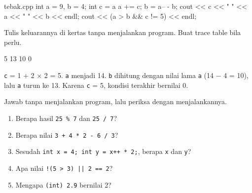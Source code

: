 \documentclass[a4paper]{article}
\begin{document}
\begin{MKode}{tebak.cpp}
int a = 9, b = 4;
int c = a %
a += c;
b = a-- - b;
cout << c << " " << a << " " << b << endl;
cout << (a > b && c != 5) << endl;
\end{MKode}
\begin{Tebak}[]
Tulis keluarannya di kertas tanpa menjalankan program. Buat trace table bila perlu.
\end{Tebak}
\begin{Jawaban}[]
\begin{MKeluaran}[]
5 13 10
0
\end{MKeluaran}
\texttt{c} = 1 + 2 × 2 = 5. \texttt{a} menjadi 14. \texttt{b} dihitung dengan nilai lama \texttt{a} (14 − 4 = 10), lalu \texttt{a} turun ke 13. Karena \texttt{c} = 5, kondisi terakhir bernilai 0.
\end{Jawaban}
\par\vspace{4pt}\par\vspace{6pt}
Jawab tanpa menjalankan program, lalu periksa dengan menjalankannya.
\begin{enumerate}
\item Berapa hasil \texttt{25 \% 7} dan \texttt{25 / 7}?
\item Berapa nilai \texttt{3 + 4 * 2 - 6 / 3}?
\item Sesudah \texttt{int x = 4; int y = x++ * 2;}, berapa \texttt{x} dan \texttt{y}?
\item Apa nilai \texttt{!(5 > 3) || 2 == 2}?
\item Mengapa \texttt{(int) 2.9} bernilai 2?
\end{enumerate}
\end{document}
